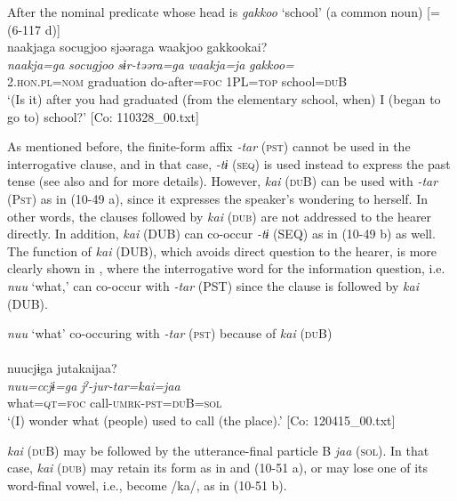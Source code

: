   \ex After the nominal predicate whose head is \textit{gakkoo} ‘school’ (a common noun) [= (6-117 d)]\\
      \glll    naakjaga  {\textbar}socugjoo{\textbar}  sjəəraga  waakjoo  {\textbar}gakkoo{\textbar}kai?\\
    \textit{naakja=ga}  \textit{socugjoo}  \textit{sɨr-təəra=ga}  \textit{waakja=ja}  \textit{gakkoo=}\\
    2.\textsc{hon}.\textsc{pl}=\textsc{nom}  graduation  do-after=\textsc{foc}  1PL=\textsc{top}  school=\textsc{du}B\\
    \glt     ‘(Is it) after you had graduated (from the elementary school, when) I (began to go to) school?’  [Co: 110328\_00.txt]
    \z
\z

As mentioned before, the finite-form affix \textit{{}-tar} (\textsc{pst}) cannot be used in the interrogative clause, and in that case, \textit{{}-tɨ} (\textsc{seq}) is used instead to express the past tense (see also  and  for more details). However, \textit{kai} (\textsc{du}B) can be used with \textit{{}-tar} (P\textsc{st}) as in (10-49 a), since it expresses the speaker’s wondering to herself. In other words, the clauses followed by \textit{kai} (\textsc{dub}) are not addressed to the hearer directly. In addition, \textit{kai} (DUB) can co-occur \textit{{}-tɨ} (SEQ) as in (10-49 b) as well. The function of \textit{kai} (DUB), which avoids direct question to the hearer, is more clearly shown in , where the interrogative word for the information question, i.e. \textit{nuu} ‘what,’ can co-occur with \textit{{}-tar} (PST) since the clause is followed by \textit{kai} (DUB).

\ea\label{ex:10.50}   \textit{nuu} ‘what’ co-occuring with \textit{{}-tar} (\textsc{pst}) because of \textit{kai} (\textsc{du}B) \\\\
      \glll    nuucjɨga  jutakaijaa?\\
    \textit{nuu=ccjɨ=ga}  \textit{jˀ-jur-tar=kai=jaa}\\
    what=\textsc{qt}=\textsc{foc}  call-\textsc{umrk}-\textsc{pst}=\textsc{du}B=\textsc{sol}\\
\glt     ‘(I) wonder what (people) used to call (the place).’  [Co: 120415\_00.txt]
\z

\textit{kai} (\textsc{du}B) may be followed by the utterance-final particle B \textit{jaa} (\textsc{sol}). In that case, \textit{kai} (\textsc{dub}) may retain its form as in  and (10-51 a), or may lose one of its word-final vowel, i.e., become /ka/, as in (10-51 b).

